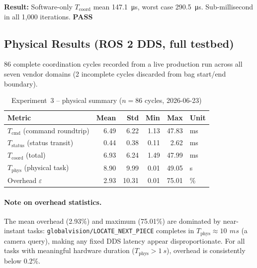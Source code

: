 \documentclass[11pt,a4paper]{article}
\newcommand{\pass}{\textcolor{passgreen}{\textbf{PASS}}}
\newcommand{\ms}{\,\si{ms}}
\begin{document}
\noindent\textbf{Result:} Software-only $T_{\text{coord}}$ mean
\SI{147.1}{\micro s}, worst case \SI{290.5}{\micro s}.
Sub-millisecond in all 1{,}000 iterations. \pass{}

\subsection{Physical Results (ROS 2 DDS, full testbed)}

86 complete coordination cycles recorded from a live production run across
all seven vendor domains (2 incomplete cycles discarded from bag
start/end boundary).

\begin{table}[h]
\centering
\caption{Experiment~3 -- physical summary ($n = 86$ cycles, 2026-06-23)}
\label{tab:exp3-physical-summary}
\begin{tabular}{@{}lrrrrl@{}}
\toprule
\textbf{Metric} & \textbf{Mean} & \textbf{Std} & \textbf{Min} & \textbf{Max} & \textbf{Unit} \\
\midrule
$T_{\text{cmd}}$ (command roundtrip)  &  6.49 &  6.22 & 1.13 & 47.83 & ms \\
$T_{\text{status}}$ (status transit)  &  0.44 &  0.38 & 0.11 &  2.62 & ms \\
$T_{\text{coord}}$ (total)            &  6.93 &  6.24 & 1.49 & 47.99 & ms \\
$T_{\text{phys}}$ (physical task)     &  8.90 &  9.99 & 0.01 & 49.05 & s  \\
Overhead $\varepsilon$                &  2.93 & 10.31 & 0.01 & 75.01 & \% \\
\bottomrule
\end{tabular}
\end{table}

\paragraph{Note on overhead statistics.}
The mean overhead (2.93\%) and maximum (75.01\%) are dominated by near-instant
tasks: \texttt{globalvision/LOCATE\_NEXT\_PIECE} completes in
$T_{\text{phys}} \approx \SI{10}{\ms}$ (a camera query), making any fixed
DDS latency appear disproportionate.
For all tasks with meaningful hardware duration ($T_{\text{phys}} > \SI{1}{s}$),
overhead is consistently below 0.2\%.
\end{document}
